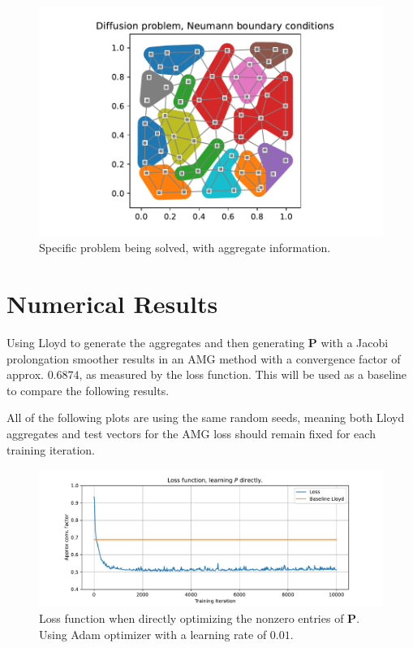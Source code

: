\documentclass{article}
\newcommand{\mat}[1]{\bm{{#1}}}
\begin{document}
\begin{figure}[h]
  \includegraphics[width=\textwidth]{figures/diffusion-lloyd-aggregates.pdf}
  \caption{Specific problem being solved, with aggregate information.}
  \label{fig:lloyd_aggregates}
\end{figure}

\section{Numerical Results}
Using Lloyd to generate the aggregates and then generating $\mat{P}$ with a Jacobi prolongation smoother results in an AMG method with a convergence factor of approx. $0.6874$, as measured by the loss function.  This will be used as a baseline to compare the following results.

All of the following plots are using the same random seeds, meaning both Lloyd aggregates and test vectors for the AMG loss should remain fixed for each training iteration.

\begin{figure}[h]
  \includegraphics[width=\textwidth]{figures/learn_p_directly.pdf}
  \caption{Loss function when directly optimizing the nonzero entries of $\mat{P}$.  Using Adam optimizer with a learning rate of $0.01$.}
  \label{fig:loss_p}
\end{figure}
\end{document}
